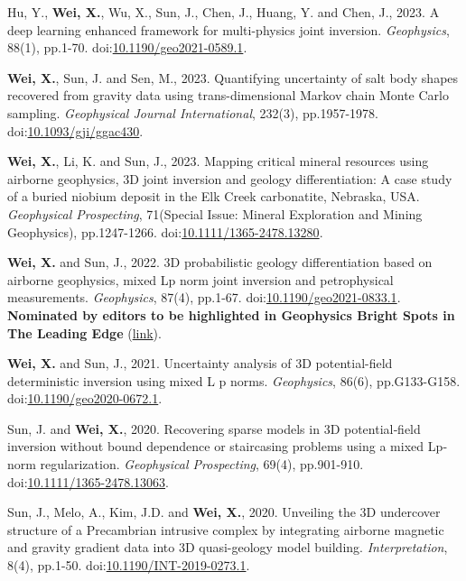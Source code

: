 \documentclass[11pt, a4paper]{article}
\newcommand{\LastName}{Wei}
\newcommand{\Initials}{X}
\newcommand{\Wei}{\textbf{\LastName, \Initials.}}  %
\newcommand{\WeiSun}{\textbf{\LastName, \Initials.} and Sun, J.}  %
\newcommand{\DOI}[1]{doi:\href{https://doi.org/#1}{#1}}
\begin{document}
\begin{etaremune}
	\item
	Hu, Y., \Wei, Wu, X., Sun, J., Chen, J., Huang, Y. and Chen, J., 2023. A deep learning enhanced framework for multi-physics joint inversion. \emph{Geophysics}, 88(1), pp.1-70. \DOI{10.1190/geo2021-0589.1}.
	
	\item
	\Wei, Sun, J. and Sen, M., 2023. Quantifying uncertainty of salt body shapes recovered from gravity data using trans-dimensional Markov chain Monte Carlo sampling. \emph{Geophysical Journal International}, 232(3), pp.1957-1978. \DOI{10.1093/gji/ggac430}.

	\item
	\Wei, Li, K. and Sun, J., 2023. Mapping critical mineral resources using airborne geophysics, 3D joint inversion and geology differentiation: A case study of a buried niobium deposit in the Elk Creek carbonatite, Nebraska, USA. \emph{Geophysical Prospecting}, 71(Special Issue: Mineral Exploration and Mining Geophysics), pp.1247-1266. \DOI{10.1111/1365-2478.13280}.

	\item
	\WeiSun, 2022. 3D probabilistic geology differentiation based on airborne geophysics, mixed Lp norm joint inversion and petrophysical measurements. \emph{Geophysics}, 87(4), pp.1-67.
	\DOI{10.1190/geo2021-0833.1}. \textbf{Nominated by editors to be highlighted in Geophysics Bright Spots in The Leading Edge }(\href{https://library.seg.org/doi/epub/10.1190/tle41100730.1}{link}).
	
	\item
	\WeiSun, 2021. Uncertainty analysis of 3D potential-field deterministic inversion using mixed L p norms. \emph{Geophysics}, 86(6), pp.G133-G158.
	\DOI{10.1190/geo2020-0672.1}.

	\item
	Sun, J. and \Wei, 2020. Recovering sparse models in 3D potential‐field inversion without bound dependence or staircasing problems using a mixed Lp‐norm regularization. \emph{Geophysical Prospecting}, 69(4), pp.901-910.
	\DOI{10.1111/1365-2478.13063}.

	\item
	Sun, J., Melo, A., Kim, J.D. and \Wei, 2020. Unveiling the 3D undercover structure of a Precambrian intrusive complex by integrating airborne magnetic and gravity gradient data into 3D quasi-geology model building. \emph{Interpretation}, 8(4), pp.1-50.
	\DOI{10.1190/INT-2019-0273.1}.

\end{etaremune}
\end{document}
